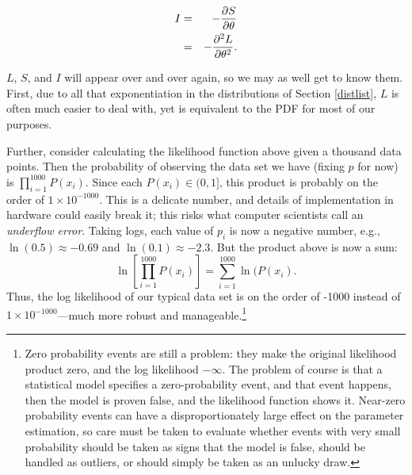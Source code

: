 \begin{eqnarray}
I&=&-{\partial S \over \partial \theta}			\nonumber\\
&=&-{\partial^2 L \over \partial \theta^2}.		\nonumber
\end{eqnarray}

$L$, $S$, and $I$ will appear over and over again, so we may as well get
to know them. First, due to all that exponentiation in the distributions
of Section \ref{distlist}, $L$ is often much easier to deal with, yet
is equivalent to the PDF for most of our purposes. 

Further, consider calculating the likelihood function above given
a thousand data points.  Then the probability of observing the data set
we have (fixing $p$ for now) is $\prod_{i=1}^{1000} P(x_i)$.  Since each
$P(x_i)\in (0,1]$, this product is probably on the order of $1\times
10^{-1000}$. This is a delicate number, and details of implementation in
hardware could easily break it; this risks what computer scientists call an
{\sl underflow error}. Taking logs, each value of $p_i$ is now a negative
number, e.g., $\ln(0.5)\approx -0.69$ and $\ln(0.1)\approx -2.3$.  But the
product above is now a sum: $$\ln\left[\prod_{i=1}^{1000} P(x_i)\right]
= \sum_{i=1}^{1000} \ln(P(x_i).$$ Thus, the log likelihood of our typical
data set is on the order of -1000 instead of $1\times 10^{-1000}$---much
more robust and manageable.\footnote{Zero probability events are still
a problem: they make the original likelihood product zero, and the log
likelihood $-\infty$. The problem of course is that a statistical model
specifies a zero-probability event, and that event happens, then the
model is proven false, and the likelihood function shows it. Near-zero
probability events can have a disproportionately large effect on the
parameter estimation, so care must be taken to evaluate whether events with very
small probability should be taken as signs that the model is false,
should be handled as outliers, or should simply be taken as an unlucky
draw.}

